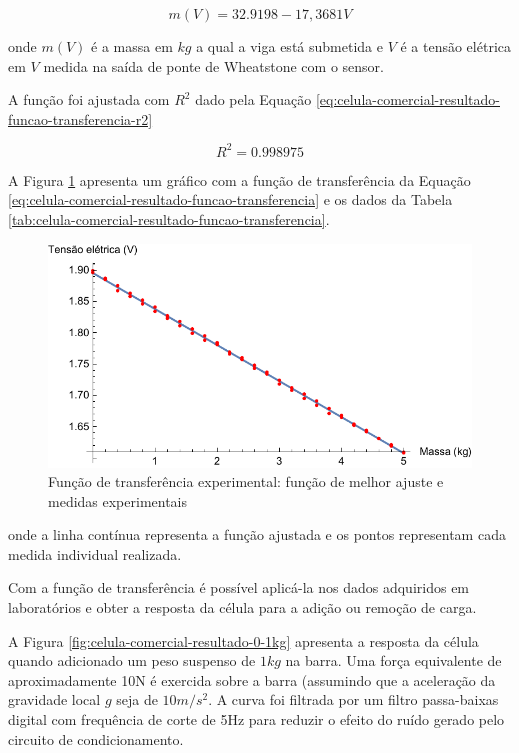 \documentclass[a4paper]{instrumentacao}
\begin{document}
\begin{equation}
	m(V) = 32.9198 - 17,3681 V
	\label{eq:celula-comercial-resultado-funcao-transferencia}
\end{equation}

\noindent onde $m(V)$ é a massa em $kg$ a qual a viga está submetida e $V$ é a tensão elétrica em $V$ medida na saída de ponte de Wheatstone com o sensor.

A função foi ajustada com $R^2$ dado pela Equação \ref{eq:celula-comercial-resultado-funcao-transferencia-r2}

\begin{equation}
	R^2 = 0.998975
	\label{eq:celula-comercial-resultado-funcao-transferencia-r2}
\end{equation}


A Figura \ref{fig:celula-comercial-resultado-funcao-transferencia} apresenta um gráfico com a função de transferência da Equação \ref{eq:celula-comercial-resultado-funcao-transferencia} e os dados da Tabela \ref{tab:celula-comercial-resultado-funcao-transferencia}.

\begin{figure}[H]
\center
\includegraphics[width=\textwidth]{Comercial-Plot.pdf}
\caption{Função de transferência experimental: função de melhor ajuste e medidas experimentais}
\label{fig:celula-comercial-resultado-funcao-transferencia}
\end{figure}

\noindent onde a linha contínua representa a função ajustada e os pontos representam cada medida individual realizada.

Com a função de transferência é possível aplicá-la nos dados adquiridos em laboratórios e obter a resposta da célula para a adição ou remoção de carga.

A Figura \ref{fig:celula-comercial-resultado-0-1kg} apresenta a resposta da célula quando adicionado um peso suspenso  de $1 kg$ na barra. Uma força equivalente de aproximadamente 10N é exercida sobre a barra (assumindo que a aceleração da gravidade local $g$ seja de $10 m/s^2$. A curva foi filtrada por um filtro passa-baixas digital com frequência de corte de 5Hz para reduzir o efeito do ruído gerado pelo circuito de condicionamento.
\end{document}
